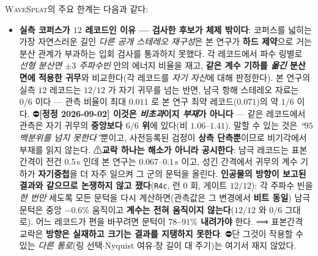 \documentclass[11pt]{report}
\numberwithin{equation}{chapter}
\numberwithin{figure}{chapter}
\numberwithin{table}{chapter}
\newcommand{\WS}{\textsc{WaveSplat}}
\begin{document}
\WS{}의 주요 한계는 다음과 같다:
\begin{itemize}
  \item \textbf{실측 코퍼스가 $12$ 레코드인 이유 --- 검사한 후보가 체제 밖이다}:
        코퍼스를 넓히는 가장 자연스러운 길인 \emph{다른 공개 스테레오 재구성}은
        본 연구가 \textbf{하드 제약}으로 거는 분산 관계가 부과하는 입회 검사를
        통과하지 못했다. 각 레코드에서 파수 링별로 \emph{선형 분산면 $\pm3$ 주파수빈}
        안의 에너지 비율을 재고, \textbf{같은 계수 기하를 \emph{옮긴} 분산면에 적용한
        귀무}와 비교한다(각 레코드를 \emph{자기 자신}에 대해 판정한다). 본 연구의 실측 $12$ 레코드는 \textbf{$12/12$} 가 자기 귀무를
        넘는 반면, 남극 항해 스테레오 자료는 \textbf{$0/6$} 이다 --- 관측 비율이 최대
        $0.011$ 로 본 연구 최약 레코드($0.071$)의 약 $1/6$ 이다.
        ⛔\textbf{[정정 2026-09-02] 이것은 \emph{비초과}이지 \emph{부재}가 아니다} ---
        같은 레코드에서 관측은 자기 귀무의 \textbf{중앙보다 $6/6$ 위}에 있다(비 $1.06$--$1.41$).
        말할 수 있는 것은 \emph{``$95$ 백분위를 넘지 못한다''}뿐이고, 사전등록된 검정이
        \textbf{상측 단측뿐}이므로 비기각에서 부재를 읽지 않는다.
        ⚠\textbf{교락 하나는 해소가 아니라 공시한다}: 남극 레코드는 표본간격이 전건
        $0.5$\,s 인데 본 연구는 $0.067$--$0.1$\,s 이고, 성긴 간격에서 귀무의 계수 기하가
        \textbf{자기중첩}을 더 자주 일으켜 그 군의 문턱을 올린다.
        \textbf{인공물의 방향이 보고된 결과와 같으므로 논쟁하지 않고 쟀다}(\texttt{R4c},
        런 $0$ 회, 게이트 $12/12$): 각 주파수 빈을 \emph{한 번만} 세도록 모든 문턱을 다시
        계산하면(관측값은 그 변경에서 \textbf{비트 동일}) 남극 문턱은 중앙 $-0.6\%$
        움직이고 \textbf{계수는 전혀 움직이지 않는다}($12/12$ 와 $0/6$ 그대로).
        어느 레코드가 편을 바꾸려면 문턱이 \textbf{$78$--$91\%$ 내려가야} 한다.
        ⟹ 표본간격 교락은 \textbf{방향은 실재하고 크기는 결과를 지탱하지 못한다}.
        ⛔단 그것이 작용할 수 있는 \emph{다른 통로}(링 선택$\cdot$Nyquist 여유$\cdot$창 길이
        대 주기)는 여기서 재지 않았다.

\end{itemize}
\end{document}
